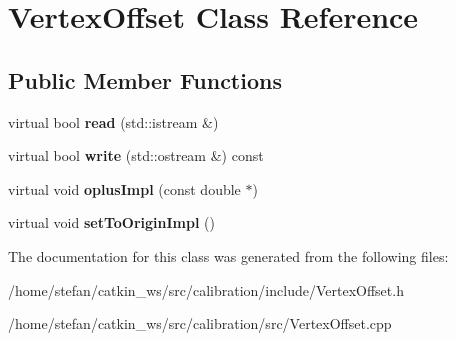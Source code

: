 \hypertarget{classVertexOffset}{\section{\-Vertex\-Offset \-Class \-Reference}
\label{classVertexOffset}
}
\subsection*{\-Public \-Member \-Functions}
\begin{DoxyCompactItemize}
\item 
\hypertarget{classVertexOffset_a273b4799e4290018314da16c83201230}{virtual bool {\bfseries read} (std\-::istream \&)}\label{classVertexOffset_a273b4799e4290018314da16c83201230}

\item 
\hypertarget{classVertexOffset_a4bf3ce6bec4f351a3f9270982d733a97}{virtual bool {\bfseries write} (std\-::ostream \&) const }\label{classVertexOffset_a4bf3ce6bec4f351a3f9270982d733a97}

\item 
\hypertarget{classVertexOffset_a6e697d722e9e160c19347931786b77cc}{virtual void {\bfseries oplus\-Impl} (const double $\ast$)}\label{classVertexOffset_a6e697d722e9e160c19347931786b77cc}

\item 
\hypertarget{classVertexOffset_a62e82a4d29bb226c12633f5d98a6b2b7}{virtual void {\bfseries set\-To\-Origin\-Impl} ()}\label{classVertexOffset_a62e82a4d29bb226c12633f5d98a6b2b7}

\end{DoxyCompactItemize}


\-The documentation for this class was generated from the following files\-:\begin{DoxyCompactItemize}
\item 
/home/stefan/catkin\-\_\-ws/src/calibration/include/\-Vertex\-Offset.\-h\item 
/home/stefan/catkin\-\_\-ws/src/calibration/src/\-Vertex\-Offset.\-cpp\end{DoxyCompactItemize}

